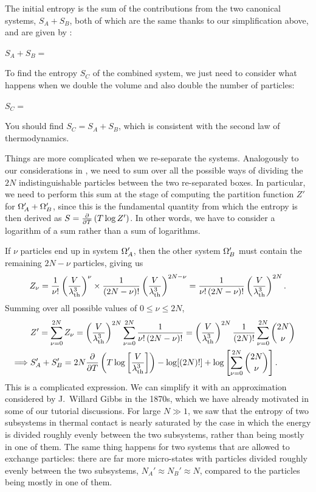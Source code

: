 \newpage %
The initial entropy is the sum of the contributions from the two canonical systems, $S_A + S_B$, both of which are the same thanks to our simplification above, and are given by :
\begin{mdframed}
  $\displaystyle S_A + S_B = $ \\[50 pt]
\end{mdframed}
To find the entropy $S_C$ of the combined system, we just need to consider what happens when we double the volume and also double the number of particles:
\begin{mdframed}
  $\displaystyle S_C = $ \\[50 pt]
\end{mdframed}
You should find $S_C = S_A + S_B$, which is consistent with the second law of thermodynamics.

Things are more complicated when we re-separate the systems.
Analogously to our considerations in , we need to sum over all the possible ways of dividing the $2N$ indistinguishable particles between the two re-separated boxes.
In particular, we need to perform this sum at the stage of computing the partition function $Z'$ for $\Omega_A' + \Omega_B'$, since this is the fundamental quantity from which the entropy is then derived as $S = \frac{\partial }{\partial T}\left(T\log Z'\right)$. %
In other words, we have to consider a logarithm of a sum rather than a sum of logarithms.

If $\nu$ particles end up in system $\Omega_A'$, then the other system $\Omega_B'$ must contain the remaining $2N - \nu$ particles, giving us
\begin{equation*}
  Z_{\nu} = \frac{1}{\nu!} \left(\frac{V}{\lambda_{\mathrm{th}}^3}\right)^{\nu} \times \frac{1}{(2N - \nu)!} \left(\frac{V}{\lambda_{\mathrm{th}}^3}\right)^{2N - \nu} = \frac{1}{\nu! \, (2N - \nu)!} \left(\frac{V}{\lambda_{\mathrm{th}}^3}\right)^{2N}.
\end{equation*}
Summing over all possible values of $0 \leq \nu \leq 2N$,
\begin{align*}
  & Z' = \sum_{\nu = 0}^{2N} Z_{\nu} = \left(\frac{V}{\lambda_{\mathrm{th}}^3}\right)^{2N} \sum_{\nu = 0}^{2N} \frac{1}{\nu! \, (2N - \nu)!} = \left(\frac{V}{\lambda_{\mathrm{th}}^3}\right)^{2N} \frac{1}{(2N)!} \sum_{\nu = 0}^{2N} \binom{2N}{\nu} \cr
  \implies & S_A' + S_B' = 2N \frac{\partial }{\partial T}\left(T\log \left[\frac{V}{\lambda_{\mathrm{th}}^3}\right]\right) - \log[(2N)!] + \log\left[\sum_{\nu = 0}^{2N} \binom{2N}{\nu}\right].
\end{align*}
This is a complicated expression.
We can simplify it with an approximation considered by J.\ Willard Gibbs in the 1870s, which we have already motivated in some of our tutorial discussions.
For large $N \gg 1$, we saw that the entropy of two subsystems in thermal contact is nearly saturated by the case in which the energy is divided roughly evenly between the two subsystems, rather than being mostly in one of them.
The same thing happens for two systems that are allowed to exchange particles: there are far more micro-states with particles divided roughly evenly between the two subsystems, $N_A' \approx N_B' \approx N$, compared to the particles being mostly in one of them.

